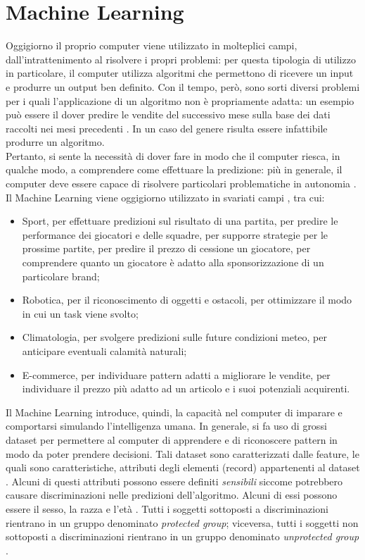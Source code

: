 \section{Machine Learning}
Oggigiorno il proprio computer viene utilizzato in molteplici campi, dall'intrattenimento al risolvere i propri problemi: per questa tipologia di utilizzo in particolare, il computer utilizza algoritmi che permettono di ricevere un input e produrre un output ben definito. Con il tempo, però, sono sorti diversi problemi per i quali l'applicazione di un algoritmo non è propriamente adatta: un esempio può essere il dover predire le vendite del successivo mese sulla base dei dati raccolti nei mesi precedenti \cite{alpaydin2020introduction}. In un caso del genere risulta essere infattibile produrre un algoritmo.\\
Pertanto, si sente la necessità di dover fare in modo che il computer riesca, in qualche modo, a comprendere come effettuare la predizione: più in generale, il computer deve essere capace di risolvere particolari problematiche in autonomia \cite{helm2020machine}.\\
Il Machine Learning viene oggigiorno utilizzato in svariati campi \cite{srivastava2019comparison}, tra cui:
\begin{itemize}
  \item Sport, per effettuare predizioni sul risultato di una partita, per predire le performance dei giocatori e delle squadre, per supporre strategie per le prossime partite, per predire il prezzo di cessione un giocatore, per comprendere quanto un giocatore è adatto alla sponsorizzazione di un particolare brand;
  \item Robotica, per il riconoscimento di oggetti e ostacoli, per ottimizzare il modo in cui un task viene svolto;
  \item Climatologia, per svolgere predizioni sulle future condizioni meteo, per anticipare eventuali calamità naturali;
  \item E-commerce, per individuare pattern adatti a migliorare le vendite, per individuare il prezzo più adatto ad un articolo e i suoi potenziali acquirenti.
\end{itemize}
Il Machine Learning introduce, quindi, la capacità nel computer di imparare e comportarsi simulando l'intelligenza umana. In generale, si fa uso di grossi dataset per permettere al computer di apprendere e di riconoscere pattern in modo da poter prendere decisioni. Tali dataset sono caratterizzati dalle feature, le quali sono caratteristiche, attributi degli elementi (record) appartenenti al dataset \cite{helm2020machine}. Alcuni di questi attributi possono essere definiti \emph{sensibili} siccome potrebbero causare discriminazioni nelle predizioni dell'algoritmo. Alcuni di essi possono essere il sesso, la razza e l'età \cite{islam2021through}. Tutti i soggetti sottoposti a discriminazioni rientrano in un gruppo denominato \emph{protected group}; viceversa, tutti i soggetti non sottoposti a discriminazioni rientrano in un gruppo denominato \emph{unprotected group} \cite{ben2019protecting}.\\
